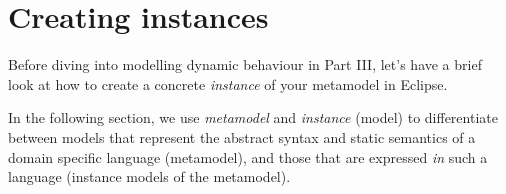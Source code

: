 \newpage
\genHeader

\section{Creating instances}
\hypertarget{sec:creatingInstance common}{}

Before diving into modelling dynamic behaviour in Part III, let's have a brief look at how to create a concrete \emph{instance} of your metamodel in Eclipse.

\vspace{0.5cm}

In the following section, we use \emph{metamodel} and \emph{instance} (model) to differentiate between models that represent the abstract syntax and static
semantics of a domain specific language (metamodel), and those that are expressed \emph{in} such a language (instance models of the metamodel).

